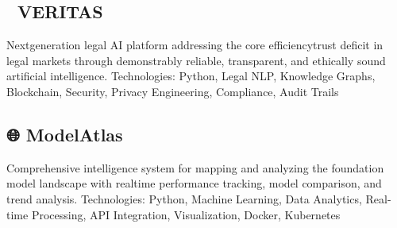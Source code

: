 \documentclass{article}
\begin{document}
\subsection*{🔬 VERITAS}
Nextgeneration legal AI platform addressing the core efficiencytrust deficit in legal markets through demonstrably reliable, transparent, and ethically sound artificial intelligence.
Technologies: Python, Legal NLP, Knowledge Graphs, Blockchain, Security, Privacy Engineering, Compliance, Audit Trails

\subsection*{🌐 ModelAtlas}
Comprehensive intelligence system for mapping and analyzing the foundation model landscape with realtime performance tracking, model comparison, and trend analysis.
Technologies: Python, Machine Learning, Data Analytics, Real-time Processing, API Integration, Visualization, Docker, Kubernetes
\end{document}
